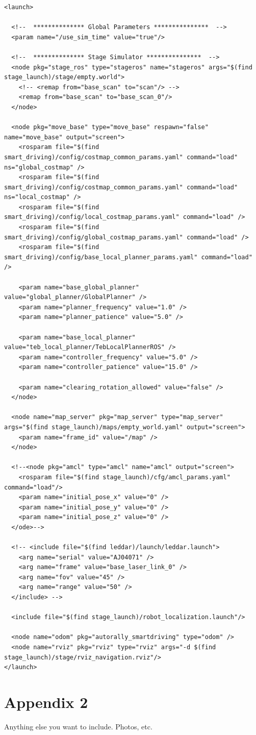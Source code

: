 \documentclass[compsoc,draftclsnofoot,onecolumn,10pt]{IEEEtran}
\begin{document}
\begin{lstlisting}[frame=single,caption={Example Custom Launch File for Stage}]
<launch>

  <!--  ************** Global Parameters ***************  -->
  <param name="/use_sim_time" value="true"/>

  <!--  ************** Stage Simulator ***************  -->
  <node pkg="stage_ros" type="stageros" name="stageros" args="$(find stage_launch)/stage/empty.world">
    <!-- <remap from="base_scan" to="scan"/> -->
    <remap from="base_scan" to="base_scan_0"/>
  </node>

  <node pkg="move_base" type="move_base" respawn="false" name="move_base" output="screen">
    <rosparam file="$(find smart_driving)/config/costmap_common_params.yaml" command="load" ns="global_costmap" />
    <rosparam file="$(find smart_driving)/config/costmap_common_params.yaml" command="load" ns="local_costmap" />
    <rosparam file="$(find smart_driving)/config/local_costmap_params.yaml" command="load" />
    <rosparam file="$(find smart_driving)/config/global_costmap_params.yaml" command="load" />
    <rosparam file="$(find smart_driving)/config/base_local_planner_params.yaml" command="load" />

    <param name="base_global_planner" value="global_planner/GlobalPlanner" />
    <param name="planner_frequency" value="1.0" />
    <param name="planner_patience" value="5.0" />

    <param name="base_local_planner" value="teb_local_planner/TebLocalPlannerROS" />
    <param name="controller_frequency" value="5.0" />
    <param name="controller_patience" value="15.0" />

    <param name="clearing_rotation_allowed" value="false" />
  </node>

  <node name="map_server" pkg="map_server" type="map_server" args="$(find stage_launch)/maps/empty_world.yaml" output="screen">
    <param name="frame_id" value="/map" />
  </node>

  <!--<node pkg="amcl" type="amcl" name="amcl" output="screen">
    <rosparam file="$(find stage_launch)/cfg/amcl_params.yaml" command="load"/>
    <param name="initial_pose_x" value="0" />
    <param name="initial_pose_y" value="0" />
    <param name="initial_pose_z" value="0" />
  </ode>-->

  <!-- <include file="$(find leddar)/launch/leddar.launch">
    <arg name="serial" value="AJ04071" />
    <arg name="frame" value="base_laser_link_0" />
    <arg name="fov" value="45" />
    <arg name="range" value="50" />
  </include> -->

  <include file="$(find stage_launch)/robot_localization.launch"/>

  <node name="odom" pkg="autorally_smartdriving" type="odom" />
  <node name="rviz" pkg="rviz" type="rviz" args="-d $(find stage_launch)/stage/rviz_navigation.rviz"/>
</launch>
\end{lstlisting}

\section{Appendix 2}
Anything else you want to include. Photos, etc.
\end{document}
